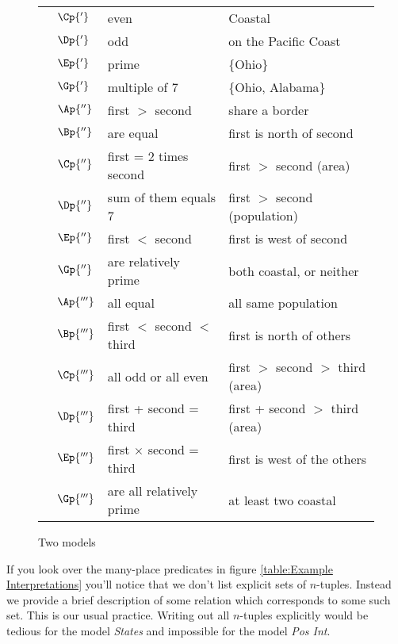\begin{figure}
\begin{longtable}[c]{ l l l l }
	&$\Cp{'}$&even&Coastal\\
	&$\Dp{'}$&odd&on the Pacific Coast\\
	&$\Ep{'}$&prime&\{Ohio\}\\
	&$\Gp{'}$&multiple of 7&\{Ohio, Alabama\}\\ \addlinespace[.25cm]
	{2-place:}&$\Ap{''}$&first $>$ second&share a border\\
	&$\Bp{''}$&are equal&first is north of second\\
	&$\Cp{''}$&first = 2 times second&first $>$ second (area)\\
	&$\Dp{''}$&sum of them equals 7&first $>$ second (population)\\
	&$\Ep{''}$&first $<$ second&first is west of second\\
	&$\Gp{''}$&are relatively prime&both coastal, or neither\\ \addlinespace[.25cm]
	{3-place:}&$\Ap{'''}$&all equal&all same population\\
	&$\Bp{'''}$&first $<$ second $<$ third&first is north of others\\
	&$\Cp{'''}$&all odd or all even&first $>$ second $>$ third (area)\\
	&$\Dp{'''}$&first + second = third&first + second $>$ third (area)\\
	&$\Ep{'''}$&first $\times$ second = third&first is west of the others\\
	&$\Gp{'''}$&are all relatively prime& at least two coastal \\
\end{longtable}
\caption{Two \GQL{} models}
\end{figure}

If you look over the many-place predicates in figure \ref{table:Example Interpretations} you'll notice that we don't list explicit sets of $n$-tuples. 
Instead we provide a brief description of some relation which corresponds to some such set. 
This is our usual practice. 
Writing out all $n$-tuples explicitly would be tedious for the model \emph{States} and impossible for the model \emph{Pos Int}.

